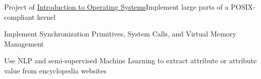 {Project of \href{http://www.ops-class.org/asst/}{Introduction to Operating Systems}}{Implement large parts of a POSIX-compliant kernel}{}{}
{
  \begin{tightitemize}
      \item Implement Synchronization Primitives, System Calls, and Virtual Memory Management
  \end{tightitemize}
}

{
  \begin{tightitemize}
      \item Use NLP and semi-supervised Machine Learning to extract attribute or attribute value from encyclopedia websites
  \end{tightitemize}
}


